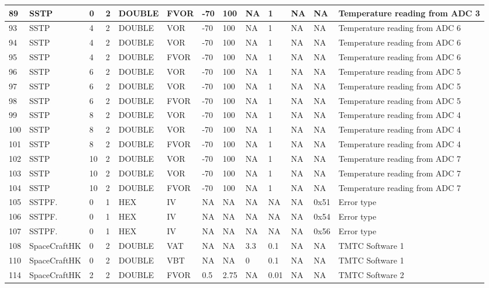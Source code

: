 {\begin{longtable}{|l|l|l|l|l|l|l|l|l|l|l|l|p{}|}
89 & SSTP & 0 & 2 & DOUBLE & FVOR & -70 & 100 & NA & 1 & NA & NA & Temperature reading from ADC 3\\ \hline
93 & SSTP & 4 & 2 & DOUBLE & VOR & -70 & 100 & NA & 1 & NA & NA & Temperature reading from ADC 6\\ \hline
94 & SSTP & 4 & 2 & DOUBLE & VOR & -70 & 100 & NA & 1 & NA & NA & Temperature reading from ADC 6\\ \hline
95 & SSTP & 4 & 2 & DOUBLE & FVOR & -70 & 100 & NA & 1 & NA & NA & Temperature reading from ADC 6\\ \hline
96 & SSTP & 6 & 2 & DOUBLE & VOR & -70 & 100 & NA & 1 & NA & NA & Temperature reading from ADC 5\\ \hline
97 & SSTP & 6 & 2 & DOUBLE & VOR & -70 & 100 & NA & 1 & NA & NA & Temperature reading from ADC 5\\ \hline
98 & SSTP & 6 & 2 & DOUBLE & FVOR & -70 & 100 & NA & 1 & NA & NA & Temperature reading from ADC 5\\ \hline
99 & SSTP & 8 & 2 & DOUBLE & VOR & -70 & 100 & NA & 1 & NA & NA & Temperature reading from ADC 4\\ \hline
100 & SSTP & 8 & 2 & DOUBLE & VOR & -70 & 100 & NA & 1 & NA & NA & Temperature reading from ADC 4\\ \hline
101 & SSTP & 8 & 2 & DOUBLE & FVOR & -70 & 100 & NA & 1 & NA & NA & Temperature reading from ADC 4\\ \hline
102 & SSTP & 10 & 2 & DOUBLE & VOR & -70 & 100 & NA & 1 & NA & NA & Temperature reading from ADC 7\\ \hline
103 & SSTP & 10 & 2 & DOUBLE & VOR & -70 & 100 & NA & 1 & NA & NA & Temperature reading from ADC 7\\ \hline
104 & SSTP & 10 & 2 & DOUBLE & FVOR & -70 & 100 & NA & 1 & NA & NA & Temperature reading from ADC 7\\ \hline
105 & SSTPF. & 0 & 1 & HEX & IV & NA & NA & NA & NA & NA & 0x51 & Error type\\ \hline
106 & SSTPF. & 0 & 1 & HEX & IV & NA & NA & NA & NA & NA & 0x54 & Error type\\ \hline
107 & SSTPF. & 0 & 1 & HEX & IV & NA & NA & NA & NA & NA & 0x56 & Error type\\ \hline
108 & SpaceCraftHK & 0 & 2 & DOUBLE & VAT & NA & NA & 3.3 & 0.1 & NA & NA & TMTC Software 1\\ \hline
110 & SpaceCraftHK & 0 & 2 & DOUBLE & VBT & NA & NA & 0 & 0.1 & NA & NA & TMTC Software 1\\ \hline
114 & SpaceCraftHK & 2 & 2 & DOUBLE & FVOR & 0.5 & 2.75 & NA & 0.01 & NA & NA & TMTC Software 2\\ \hline

\end{longtable}}
